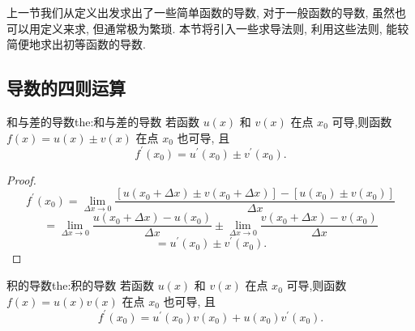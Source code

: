 上一节我们从定义出发求出了一些简单函数的导数, 对于一般函数的导数, 虽然也可以用定义来求, 但通常极为繁琐. 本节将引入一些求导法则, 利用这些法则, 能较简便地求出初等函数的导数.

\subsection{导数的四则运算}

\begin{theorem}{和与差的导数}{the:和与差的导数}
若函数 \(u\left( x\right)\) 和 \(v\left( x\right)\) 在点 \({x}_{0}\) 可导,则函数 \(f\left( x\right)  = u\left( x\right)  \pm  v\left( x\right)\) 在点 \({x}_{0}\) 也可导, 且
\[
{f}^{\prime }\left( {x}_{0}\right)  = {u}^{\prime }\left( {x}_{0}\right)  \pm  {v}^{\prime }\left( {x}_{0}\right) . \tag{1}
\]
\end{theorem}

\begin{proof}
\[
{f}^{\prime }\left( {x}_{0}\right)  = \mathop{\lim }\limits_{{{\Delta x} \rightarrow  0}}\frac{\left\lbrack  {u\left( {{x}_{0} + {\Delta x}}\right)  \pm  v\left( {{x}_{0} + {\Delta x}}\right) }\right\rbrack   - \left\lbrack  {u\left( {x}_{0}\right)  \pm  v\left( {x}_{0}\right) }\right\rbrack  }{\Delta x}
\]
\[
= \mathop{\lim }\limits_{{{\Delta x} \rightarrow  0}}\frac{u\left( {{x}_{0} + {\Delta x}}\right)  - u\left( {x}_{0}\right) }{\Delta x} \pm  \mathop{\lim }\limits_{{{\Delta x} \rightarrow  0}}\frac{v\left( {{x}_{0} + {\Delta x}}\right)  - v\left( {x}_{0}\right) }{\Delta x}
\]
\[
= {u}^{\prime }\left( {x}_{0}\right)  \pm  {v}^{\prime }\left( {x}_{0}\right) .
\]
\end{proof}

\begin{theorem}{积的导数}{the:积的导数}
若函数 \(u\left( x\right)\) 和 \(v\left( x\right)\) 在点 \({x}_{0}\) 可导,则函数 \(f\left( x\right)  = u\left( x\right) v\left( x\right)\) 在点 \({x}_{0}\) 也可导, 且
\[
{f}^{\prime }\left( {x}_{0}\right)  = {u}^{\prime }\left( {x}_{0}\right) v\left( {x}_{0}\right)  + u\left( {x}_{0}\right) {v}^{\prime }\left( {x}_{0}\right) . \tag{2}
\]
\end{theorem}

